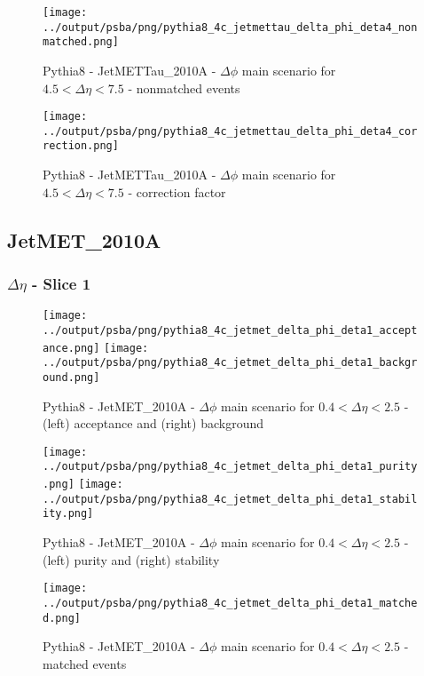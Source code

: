 \documentclass[11pt]{book}
\begin{document}
\begin{figure}[ht]
\centering
\texttt{[image: ../output/psba/png/pythia8\_4c\_jetmettau\_delta\_phi\_deta4\_nonmatched.png]}
\caption{Pythia8 - JetMETTau\_2010A - $\Delta\phi$ main scenario for $4.5 < \Delta\eta < 7.5$ - nonmatched events}
\label{fig:p8_jetmettau_delta_phi_deta4_nonmatched}
\end{figure}

\begin{figure}[ht]
\centering
\texttt{[image: ../output/psba/png/pythia8\_4c\_jetmettau\_delta\_phi\_deta4\_correction.png]}
\caption{Pythia8 - JetMETTau\_2010A - $\Delta\phi$ main scenario for $4.5 < \Delta\eta < 7.5$ - correction factor}
\label{fig:p8_jetmettau_delta_phi_deta4_correction}
\end{figure}


\clearpage
\subsection{JetMET\_2010A}

\subsubsection{$\Delta\eta$ - Slice 1}
\begin{figure}[ht]
\centering
\texttt{[image: ../output/psba/png/pythia8\_4c\_jetmet\_delta\_phi\_deta1\_acceptance.png]}
\texttt{[image: ../output/psba/png/pythia8\_4c\_jetmet\_delta\_phi\_deta1\_background.png]}
\caption{Pythia8 - JetMET\_2010A - $\Delta\phi$ main scenario for $0.4 < \Delta\eta < 2.5$ - (left) acceptance and (right) background}
\label{fig:p8_jetmet_delta_phi_deta1_ab}
\end{figure}

\begin{figure}[ht]
\centering
\texttt{[image: ../output/psba/png/pythia8\_4c\_jetmet\_delta\_phi\_deta1\_purity.png]}
\texttt{[image: ../output/psba/png/pythia8\_4c\_jetmet\_delta\_phi\_deta1\_stability.png]}
\caption{Pythia8 - JetMET\_2010A - $\Delta\phi$ main scenario for $0.4 < \Delta\eta < 2.5$ - (left) purity and (right) stability}
\label{fig:p8_jetmet_delta_phi_deta1_ps}
\end{figure}

\begin{figure}[ht]
\centering
\texttt{[image: ../output/psba/png/pythia8\_4c\_jetmet\_delta\_phi\_deta1\_matched.png]}
\caption{Pythia8 - JetMET\_2010A - $\Delta\phi$ main scenario for $0.4 < \Delta\eta < 2.5$ - matched events}
\label{fig:p8_jetmet_delta_phi_deta1_matched}
\end{figure}
\end{document}

